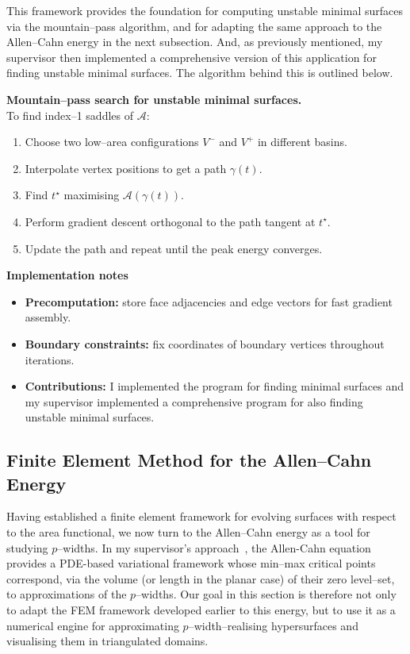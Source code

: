 \FloatBarrier
\noindent This framework provides the foundation for computing unstable minimal surfaces via the mountain–pass algorithm, and for adapting the same approach to the Allen–Cahn energy in the next subsection. And, as previously mentioned, my supervisor then implemented a comprehensive version of this application for finding unstable minimal surfaces. The algorithm behind this is outlined below.

\noindent\textbf{Mountain–pass search for unstable minimal surfaces.}\\
To find index--1 saddles of $\mathcal{A}$:
\begin{enumerate}
    \item Choose two low–area configurations $V^-$ and $V^+$ in different basins.
    \item Interpolate vertex positions to get a path $\gamma(t)$.
    \item Find $t^\star$ maximising $\mathcal{A}(\gamma(t))$.
    \item Perform gradient descent orthogonal to the path tangent at $t^\star$.
    \item Update the path and repeat until the peak energy converges.
\end{enumerate}

\noindent\textbf{Implementation notes}
\begin{itemize}
    \item \textbf{Precomputation:} store face adjacencies and edge vectors for fast gradient assembly.
    \item \textbf{Boundary constraints:} fix coordinates of boundary vertices throughout iterations.
    \item \textbf{Contributions:} I implemented the program for finding minimal surfaces and my supervisor implemented a comprehensive program for also finding unstable minimal surfaces.
\end{itemize}

\subsection{Finite Element Method for the Allen--Cahn Energy}\label{sec:planar-widths-program}
Having established a finite element framework for evolving surfaces with respect to the area functional, we now turn to the Allen--Cahn energy as a tool for studying $p$–widths. In my supervisor's approach~\cite{Guaraco18}, the Allen-Cahn equation provides a PDE-based variational framework whose min--max critical points correspond, via the volume (or length in the planar case) of their zero level--set, to approximations of the $p$--widths. Our goal in this section is therefore not only to adapt the FEM framework developed earlier to this energy, but to use it as a numerical engine for approximating $p$–width–realising hypersurfaces and visualising them in triangulated domains.

